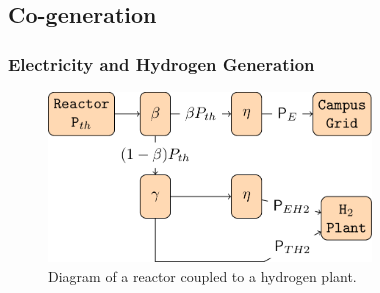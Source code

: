 \subsection{Co-generation}
\begin{frame}
\frametitle{Electricity and Hydrogen Generation}
	\begin{figure}[htbp!]
		\begin{center}
			\includegraphics[height=4.5cm]{images/hte-figure0.png}
		\end{center}
		\caption{Diagram of a reactor coupled to a hydrogen plant.}
	\end{figure}
\end{frame}



